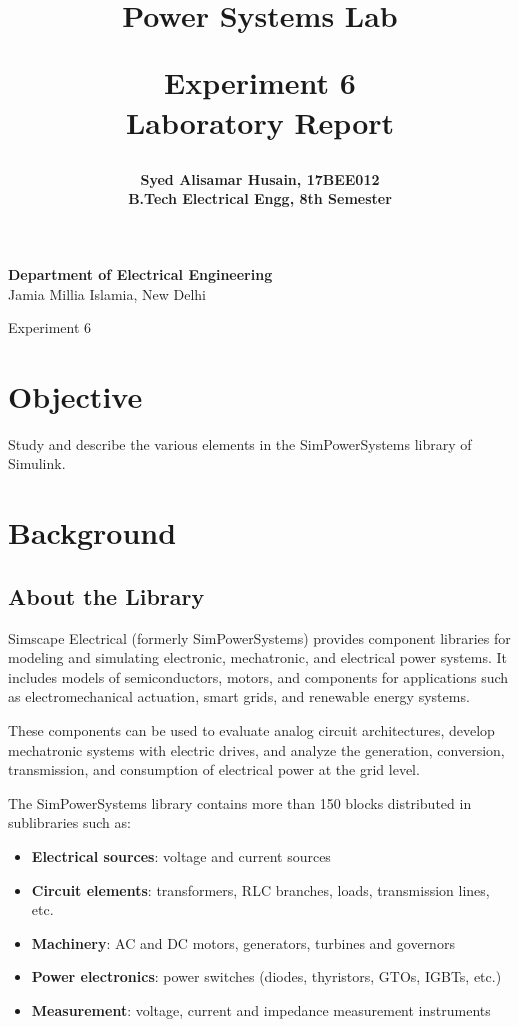 \documentclass[a4paper,12pt]{article}
\title{
  {\Huge \bf Power Systems Lab}\\
  \vspace{0.25in}

  {\bf Experiment 6}\\
  Laboratory Report
  \vspace{1in}
}
\author{
  \bf Syed Alisamar Husain, 17BEE012\\
  B.Tech Electrical Engg, 8th Semester
}
\begin{document}
  \begin{titlepage}
    \maketitle
    \vspace*{\fill}
    \begin{center}
      {\bfseries Department of Electrical Engineering} \\
      Jamia Millia Islamia, New Delhi
    \end{center}
    \thispagestyle{empty}
  \end{titlepage}
  
  \newpage
  \begin{center}
    \huge Experiment 6
    \vspace{0.5in}
  \end{center}

  \section{Objective}
  Study and describe the various elements in the SimPowerSystems library of Simulink.

  \section{Background}
    \subsection{About the Library}
    Simscape Electrical (formerly SimPowerSystems) 
    provides component libraries for modeling and simulating electronic, 
    mechatronic, and electrical power systems. It includes models of 
    semiconductors, motors, and components for applications such as 
    electromechanical actuation, smart grids, and renewable energy systems. 
    
    These components can be used to evaluate analog circuit architectures, 
    develop mechatronic systems with electric drives, and analyze the generation, 
    conversion, transmission, and consumption of electrical power at the grid level.

    The SimPowerSystems library contains more than 150 blocks distributed in 
    sublibraries such as:
    \begin{itemize}
      \item {\bf Electrical sources}: voltage and current sources
      \item {\bf Circuit elements}: transformers, RLC branches, loads, transmission lines, etc.
      \item {\bf Machinery}: AC and DC motors, generators, turbines and governors
      \item {\bf Power electronics}: power switches (diodes, thyristors, GTOs, IGBTs, etc.)
      \item {\bf Measurement}: voltage, current and impedance measurement instruments
    \end{itemize}
\end{document}
